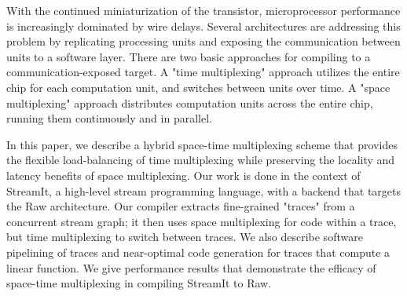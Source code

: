 With the continued miniaturization of the transistor, microprocessor
performance is increasingly dominated by wire delays.  Several
architectures are addressing this problem by replicating processing
units and exposing the communication between units to a software
layer.  There are two basic approaches for compiling to a
communication-exposed target.  A "time multiplexing" approach utilizes
the entire chip for each computation unit, and switches between units
over time.  A "space multiplexing" approach distributes computation
units across the entire chip, running them continuously and in
parallel.

In this paper, we describe a hybrid space-time multiplexing scheme
that provides the flexible load-balancing of time multiplexing while
preserving the locality and latency benefits of space multiplexing.
Our work is done in the context of StreamIt, a high-level stream
programming language, with a backend that targets the Raw
architecture.  Our compiler extracts fine-grained "traces" from a
concurrent stream graph; it then uses space multiplexing for code
within a trace, but time multiplexing to switch between traces.  We
also describe software pipelining of traces and near-optimal code
generation for traces that compute a linear function.  We give
performance results that demonstrate the efficacy of space-time
multiplexing in compiling StreamIt to Raw.
